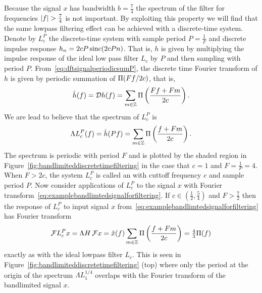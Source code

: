 Because the signal $x$ has bandwidth $b = \tfrac{7}{4}$ the spectrum of the filter for frequencies $\left\vert f \right\vert > \tfrac{7}{4}$ is not important.  By exploiting this property we will find that the same lowpass filtering effect can be achieved with a discrete-time system.  Denote by $L_{c}^P$ the discrete-time system with sample period $P = \tfrac{1}{F}$ and discrete impulse response $h_n = 2cP \operatorname{sinc}(2c Pn)$.  That is, $h$ is given by multiplying the impulse response of the ideal low pass filter $L_c$ by $P$ and then sampling with period $P$.  From~\eqref{eq:dftsignalperiodicsumP}, the discrete time Fourier transform of $h$ is given by periodic summation of $\Pi(Ff/2c)$, that is,
\[
\hat{h}(f) = {\mathcal D} h(f) = \sum_{m \in {\mathbb Z}} \Pi\left( \frac{Ff + Fm}{2c}\right).
\] 
We are lead to believe that the spectrum of $L_c^P$ is
\begin{equation}\label{eq:LambdaHidealklowpassdigitalsceptical}
\Lambda L_c^P(f) = \hat{h}(Pf) = \sum_{m \in {\mathbb Z}} \Pi\left( \frac{f + Fm}{2c}\right).
\end{equation}
The spectrum is periodic with period $F$ and is plotted by the shaded region in Figure~\ref{fig:bandlimiteddiscretetimefiltering} in the case that $c = 1$ and $F = \tfrac{1}{P} = 4$.  When $F > 2c$, the system $L_c^P$ is called an  with cuttoff frequency $c$ and sample period $P$. Now consider applications of $L_c^P$ to the signal $x$ with Fourier transform~\ref{eq:examplebandlimtedsignalforfiltering}.  If $c \in (\tfrac{1}{2}, \tfrac{5}{4})$ and $F > \tfrac{7}{2}$ then the response of $L_c^P$ to input signal $x$ from~\eqref{eq:examplebandlimtedsignalforfiltering} has Fourier transform
\[
{\mathcal F} L_c^P x = \Lambda H \, {\mathcal F} x = \hat{x}(f) \sum_{m \in {\mathbb Z}} \Pi\left( \frac{f + Fm}{2c}\right) = \tfrac{4}{3} \Pi(f)
\]
exactly as with the ideal lowpass filter $L_c$.  This is seen in Figure~\ref{fig:bandlimiteddiscretetimefiltering} (top) where only the period at the origin of the spectrum $\Lambda L_1^{1/4}$ overlaps with the Fourier transform of the bandlimited signal $x$.

